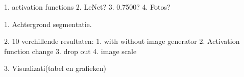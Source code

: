 

1. activation functions
2. LeNet?
3. 0.7500?
4. Fotos?



1. Achtergrond segmentatie.

2. 10 verchillende resultaten:
	1. with without image generator
	2. Activation function change
	3. drop out
	4. image scale

3. Visualizati(tabel en grafieken)
